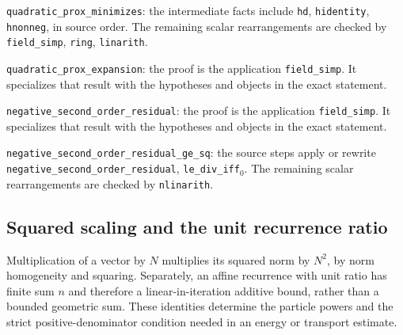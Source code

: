 \documentclass[11pt,a4paper]{report}
\begin{document}
\begin{leanbox}
\texttt{quadratic\_\allowbreak{}prox\_\allowbreak{}minimizes}: the intermediate facts include \texttt{hd}, \texttt{hidentity}, \texttt{hnonneg}, in source order. The remaining scalar rearrangements are checked by \texttt{field\_\allowbreak{}simp}, \texttt{ring}, \texttt{linarith}.



\texttt{quadratic\_\allowbreak{}prox\_\allowbreak{}expansion}: the proof is the application \texttt{field\_\allowbreak{}simp}. It specializes that result with the hypotheses and objects in the exact statement.



\texttt{negative\_\allowbreak{}second\_\allowbreak{}order\_\allowbreak{}residual}: the proof is the application \texttt{field\_\allowbreak{}simp}. It specializes that result with the hypotheses and objects in the exact statement.



\texttt{negative\_\allowbreak{}second\_\allowbreak{}order\_\allowbreak{}residual\_\allowbreak{}ge\_\allowbreak{}sq}: the source steps apply or rewrite \texttt{negative\_\allowbreak{}second\_\allowbreak{}order\_\allowbreak{}residual}, \texttt{le\_\allowbreak{}div\_\allowbreak{}iff\ensuremath{{}_{0}}}. The remaining scalar rearrangements are checked by \texttt{nlinarith}.
\end{leanbox}
\subsection{\texorpdfstring{Squared scaling and the unit recurrence ratio}{Squared scaling and the unit recurrence ratio}}
\label{report-step-ProximalLangevin-Corrections-lean-2}


Multiplication of a vector by \(N\) multiplies its squared norm by \(N^2\), by norm homogeneity and squaring. Separately, an affine recurrence with unit ratio has finite sum \(n\) and therefore a linear-in-iteration additive bound, rather than a bounded geometric sum. These identities determine the particle powers and the strict positive-denominator condition needed in an energy or transport estimate.
\end{document}

